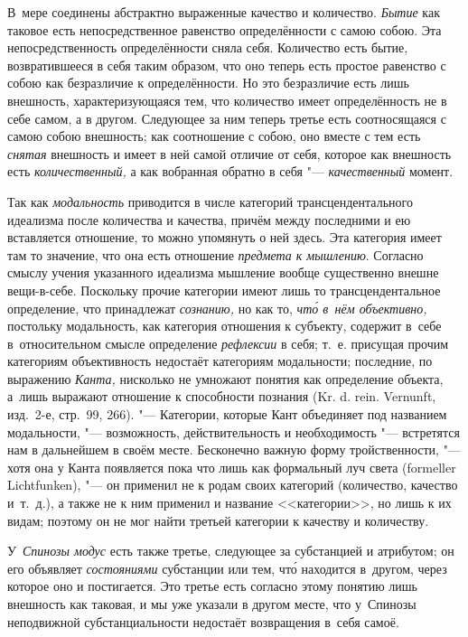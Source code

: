 В~мере соединены абстрактно выраженные качество и количество. {\em Бытие} как
таковое есть непосредственное равенство определённости с самою собою. Эта
непосредственность определённости сняла себя. Количество есть бытие,
возвратившееся в себя таким образом, что оно теперь есть простое равенство
с собою как безразличие к определённости. Но это безразличие есть лишь
внешность, характеризующаяся тем, что количество имеет определённость не в себе
самом, а в другом. Следующее за ним теперь третье есть соотносящаяся с самою
собою внешность; как соотношение с собою, оно вместе с тем есть {\em снятая}
внешность и имеет в ней самой отличие от себя, которое как внешность есть
{\em количественный,} а как вобранная обратно в себя "--- {\em качественный}
момент.

Так как {\em модальность} приводится в числе категорий трансцендентального
идеализма после количества и качества, причём между последними и ею вставляется
отношение, то можно упомянуть о ней здесь. Эта категория имеет там то значение,
что она есть отношение {\em предмета к мышлению}. Согласно смыслу учения
указанного идеализма мышление вообще существенно внешне вещи-в-себе. Поскольку
прочие категории имеют лишь то трансцендентальное определение, что принадлежат
{\em сознанию,} но как то, {\em чт\'{о} в~нём объективно,} постольку
модальность, как категория отношения к субъекту, содержит в~себе
в~относительном смысле определение {\em рефлексии} в себя; т.~е. присущая
прочим категориям объективность недостаёт категориям модальности; последние, по
выражению {\em Канта,} нисколько не умножают понятия как определение объекта,
а~лишь выражают отношение к способности познания (Kr. d. rein. Vernunft,
изд.~2-е, стр.~99, 266). "--- Категории, которые Кант объединяет под названием
модальности, "--- возможность, действительность и необходимость "--- встретятся
нам в дальнейшем в своём месте. Бесконечно важную форму тройственности, "---
хотя она у Канта появляется пока что лишь как формальный луч света (formeller
Lichtfunken), "--- он применил не к родам своих категорий (количество, качество
и~т.~д.), а также не к ним применил и название <<категории>>, но лишь к их
видам; поэтому он не мог найти третьей категории к качеству и количеству.

У~{\em Спинозы модус} есть также третье, следующее за субстанцией и атрибутом;
он его объявляет {\em состояниями} субстанции или тем, чт\'{о} находится
в~другом, через которое оно и постигается. Это третье есть согласно этому
понятию лишь внешность как таковая, и мы уже указали в другом месте, что
у~Спинозы неподвижной субстанциальности недостаёт возвращения в~себя самоё.

